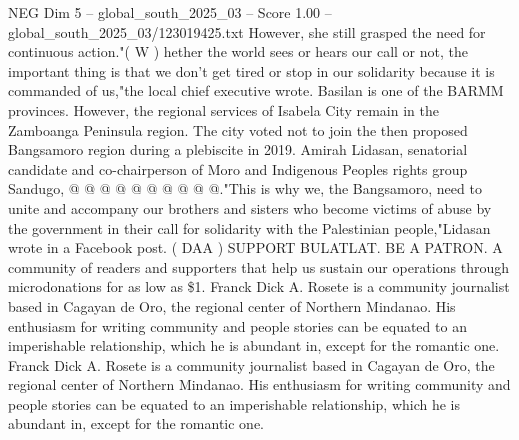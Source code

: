 \begin{textsample}{NEG Dim 5 – global\_south\_2025\_03 – Score 1.00 – global\_south\_2025\_03/123019425.txt}
However, she still grasped the need for continuous action."( W ) hether the world sees or hears our call or not, the important thing is that we don't get tired or stop in our solidarity because it is commanded of us,"the local chief executive wrote.
Basilan is one of the BARMM provinces.
However, the regional services of Isabela City remain in the Zamboanga Peninsula region.
The city voted not to join the then proposed Bangsamoro region during a plebiscite in 2019.
Amirah Lidasan, senatorial candidate and co-chairperson of Moro and Indigenous Peoples rights group Sandugo, @ @ @ @ @ @ @ @ @ @."This is why we, the Bangsamoro, need to unite and accompany our brothers and sisters who become victims of abuse by the government in their call for solidarity with the Palestinian people,"Lidasan wrote in a Facebook post. ( DAA ) SUPPORT BULATLAT.
BE A PATRON.
A community of readers and supporters that help us sustain our operations through microdonations for as low as \$1.
Franck Dick A.
Rosete is a community journalist based in Cagayan de Oro, the regional center of Northern Mindanao.
His enthusiasm for writing community and people stories can be equated to an imperishable relationship, which he is abundant in, except for the romantic one.
Franck Dick A.
Rosete is a community journalist based in Cagayan de Oro, the regional center of Northern Mindanao.
His enthusiasm for writing community and people stories can be equated to an imperishable relationship, which he is abundant in, except for the romantic one.

\end{textsample}
